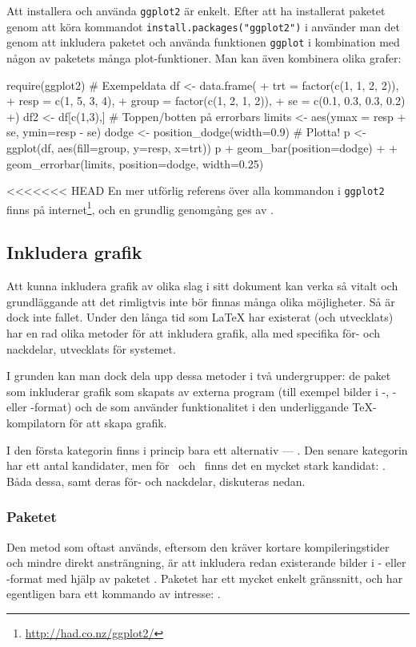 \documentclass[10pt,../../a4.tex]{subfiles}
\begin{document}
Att installera och använda \texttt{ggplot2} är enkelt. Efter att ha 
installerat paketet genom att köra kommandot
\verb|install.packages("ggplot2")|
i \Rlogo använder man det genom att inkludera paketet och använda
funktionen \texttt{ggplot} i kombination med någon av paketets många
plot-funktioner. Man kan även kombinera olika grafer:
\begin{rcode}
require(ggplot2)
# Exempeldata
df <- data.frame(
+   trt = factor(c(1, 1, 2, 2)),
+   resp = c(1, 5, 3, 4), 
+   group = factor(c(1, 2, 1, 2)),
+   se = c(0.1, 0.3, 0.3, 0.2)
+) 
df2 <- df[c(1,3),] 
# Toppen/botten på errorbars
limits <- aes(ymax = resp + se, ymin=resp - se)
dodge <- position_dodge(width=0.9)
# Plotta!
p <- ggplot(df, aes(fill=group, y=resp, x=trt))
p + geom_bar(position=dodge) +
  + geom_errorbar(limits, position=dodge, width=0.25)
\end{rcode}

<<<<<<< HEAD
En mer utförlig referens över alla kommandon i \texttt{ggplot2} finns
på internet\footnote{\url{http://had.co.nz/ggplot2/}}, och en grundlig
genomgång ges av \textcite{Hadley09}.

\subsection{Inkludera grafik}\label{sec:includegraphics}
Att kunna inkludera grafik av olika slag i sitt dokument kan verka så
vitalt och grundläggande att det rimligtvis inte bör finnas många olika
möjligheter. Så är dock inte fallet. Under den långa tid som \LaTeX{} har
existerat (och utvecklats) har en rad olika metoder för att inkludera
grafik, alla med specifika för- och nackdelar, utvecklats för systemet.

I grunden kan man dock dela upp dessa metoder i två undergrupper: de
paket som inkluderar grafik som skapats av externa program (till
exempel bilder i \PDF-, \PNG- eller \JPEG-format) och de som använder
funktionalitet i den underliggande \TeX-kompilatorn för att skapa grafik.

I den första kategorin finns i princip bara ett alternativ
— . Den senare kategorin har ett antal kandidater,
men för \pdfLaTeX\ och \XeTeX\ finns det en mycket stark kandidat:
\PGFTikZ. Båda dessa, samt deras för- och nackdelar, diskuteras nedan.

\subsubsection{Paketet }
Den metod som oftast används, eftersom den kräver kortare
kompileringstider och mindre direkt ansträngning, är att inkludera
redan existerande bilder i \PDF- eller \PNG-format med hjälp av
paketet . Paketet har ett mycket enkelt gränssnitt, och
har egentligen bara ett kommando av intresse: .
\end{document}
